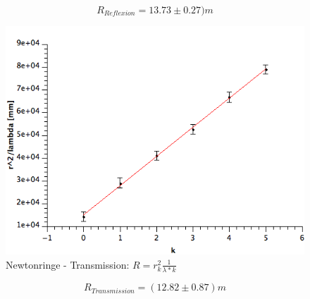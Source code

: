 \documentclass[12pt,a4paper]{article}
\begin{document}
$$R_{Reflexion} = 13.73 \pm 0.27)m$$



\begin{figure}[H]
	\centering
	\includegraphics[scale=0.70]{./figure/newtonringe_transmiss_regress.png}
	\caption{Newtonringe - Transmission: $R=r_k^2\frac{1}{\lambda *k}$}
	\label{fig:newtonringe_transmiss_regress}
\end{figure}

$$R_{Transmission}=(12.82 \pm 0.87)m$$
\end{document}
